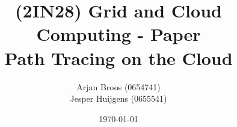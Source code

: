 \title{(2IN28) Grid and Cloud Computing - Paper \\
    Path Tracing on the Cloud}
\date{\today}
\author{Arjan Broos (0654741) \\ Jesper Huijgens (0655541)}
\maketitle
